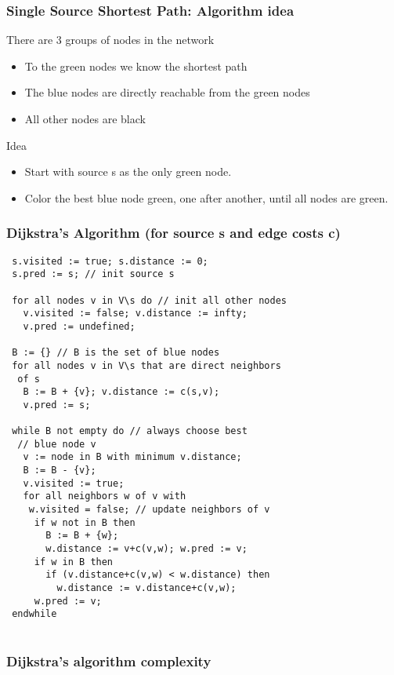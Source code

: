 \documentclass[10pt, a4paper, twocolumn]{scrartcl}
\begin{document}
\subsubsection{Single Source Shortest Path: Algorithm idea}

There are 3 groups of nodes in the network
\begin{itemize}
	\item To the green nodes we know the shortest path
	\item The blue nodes are directly reachable from the green nodes
	\item All other nodes are black
\end{itemize}

Idea
\begin{itemize}
	\item Start with source s as the only green node.
	\item Color the best blue node green, one after another, until all nodes are green.
\end{itemize}

\subsubsection{Dijkstra's Algorithm (for source s and edge costs c)}

\small
\begin{verbatim}
 s.visited := true; s.distance := 0;
 s.pred := s; // init source s

 for all nodes v in V\s do // init all other nodes
   v.visited := false; v.distance := infty;
   v.pred := undefined;
 
 B := {} // B is the set of blue nodes
 for all nodes v in V\s that are direct neighbors
  of s
   B := B + {v}; v.distance := c(s,v);
   v.pred := s;

 while B not empty do // always choose best
  // blue node v
   v := node in B with minimum v.distance;
   B := B - {v};
   v.visited := true;
   for all neighbors w of v with 
    w.visited = false; // update neighbors of v
     if w not in B then
       B := B + {w};
       w.distance := v+c(v,w); w.pred := v;
     if w in B then
       if (v.distance+c(v,w) < w.distance) then
         w.distance := v.distance+c(v,w);
	 w.pred := v;
 endwhile
 
\end{verbatim}
\normalsize


\subsubsection{Dijkstra's algorithm complexity}
\end{document}
